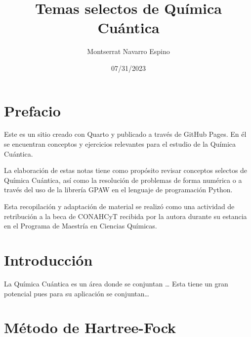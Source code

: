\documentclass[
  letterpaper,
  DIV=11,
  numbers=noendperiod]{scrreprt}
\title{Temas selectos de Química Cuántica}
\author{Montserrat Navarro Espino}
\date{07/31/2023}
\renewcommand*\contentsname{Table of contents}
\newcommand\contentsname{Table of contents}
\begin{document}
\maketitle
\ifdefined\Shaded\renewenvironment{Shaded}{\begin{tcolorbox}[borderline west={3pt}{0pt}{shadecolor}, breakable, enhanced, sharp corners, frame hidden, boxrule=0pt, interior hidden]}{\end{tcolorbox}}\fi

\renewcommand*\contentsname{Table of contents}
{
\hypersetup{linkcolor=}
\setcounter{tocdepth}{2}
\tableofcontents
}

\hypertarget{prefacio}{%
\chapter*{Prefacio}\label{prefacio}}

Este es un sitio creado con Quarto y publicado a través de GitHub Pages.
En él se encuentran conceptos y ejercicios relevantes para el estudio de
la Química Cuántica.

La elaboración de estas notas tiene como propósito revisar conceptos
selectos de Química Cuántica, así como la resolución de problemas de
forma numérica o a través del uso de la librería GPAW en el lenguaje de
programación Python.

Esta recopilación y adaptación de material se realizó como una actividad
de retribución a la beca de CONAHCyT recibida por la autora durante su
estancia en el Programa de Maestría en Ciencias Químicas.


\hypertarget{introducciuxf3n}{%
\chapter{Introducción}\label{introducciuxf3n}}

La Química Cuántica es un área donde se conjuntan \ldots{} Esta tiene un
gran potencial pues para su aplicación se conjuntan\ldots{}


\hypertarget{muxe9todo-de-hartree-fock}{%
\chapter{Método de Hartree-Fock}\label{muxe9todo-de-hartree-fock}}
\end{document}
